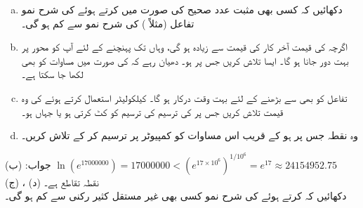 \begin{enumerate}[a.]
\item
دکھائیں کہ کسی بھی مثبت عدد صحیح  کی صورت میں  کرتے ہوئے  کی شرح نمو تفاعل  (مثلاً ) کی شرح نمو سے کم ہو گی۔
\item
اگرچہ  کی قیمت آخر کار  کی قیمت سے زیادہ ہو گی، وہاں تک پہنچنے کے لئے آپ کو محور  پر بہت دور جانا ہو گا۔ ایسا  تلاش کریں جس پر  ہو۔ دھیان رہے کہ  کی صورت میں مساوات  کو  بھی لکھا جا سکتا ہے۔
\item
تفاعل  کو بھی  سے بڑھنے  کے لئے  بہت وقت درکار ہو گا۔ کیلکولیٹر استعمال کرتے ہوئے  کی وہ قیمت تلاش کریں جس پر  کی ترسیم  کی ترسیم کو کٹ کرتی ہو یا جہاں  ہو۔
\item
وہ نقطہ جس پر  ہو کے قریب اس مساوات  کو کمپیوٹر پر ترسیم کر کے  تلاش کریں۔
\end{enumerate}
جواب:\quad
(ب) 
$\ln(e^{\num{17000000}})=\num{17000000}<(e^{17\times 10^6})^{1/10^6}=e^{17}\approx \num{24154952.75}$\\
(ج)  ، (د) نقطہ تقاطع  ہے۔
\\
دکھائیں کہ  کرتے ہوئے  کی شرح نمو کسی بھی غیر مستقل کثیر رکنی سے کم ہو گی۔
\\

